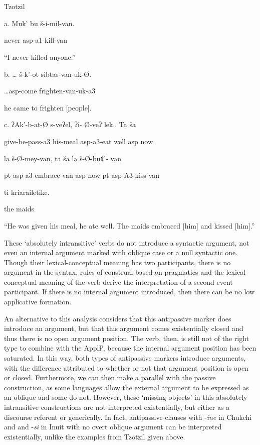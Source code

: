 \documentclass[output=paper,modfonts,nonflat]{langsci/langscibook}
\begin{document}
\ea%
    \label{ex:key:16}
    \gll\\
        \\
    \glt
    \z

          Tzotzil \citep{Aissen1983}

a.  Muk’  bu  š-i-mil-van.

  never    asp{}-a1-kill-van

“I never killed anyone.”

b.  … š-k’-ot  sibtas-van-uk-Ø.

  …asp{}-come  frighten-van{}-uk{}-a3

  he came to frighten [people].

c.  ʔAk’-b-at-Ø        s-veʔel,  ʔi-  Ø-veʔ    lek..  Ta  ša      

  give-be-pass-a3  his-meal  asp-a3-eat  well  asp     now 

  la  š-Ø-mey-van,  ta  ša  la  š-Ø-buȼ’- van

  pt  asp-a3-embrace-van  asp   now  pt   asp-A3-kiss-van

  ti  kriarailetike.

  the   maids

“He was given his meal, he ate well.  The maids embraced [him] and kissed [him].”

These ‘absolutely intransitive’ verbs do not introduce a syntactic argument, not even an internal argument marked with oblique case or a null syntactic one.  Though their lexical-conceptual meaning has two participants, there is no argument in the syntax; rules of construal based on pragmatics and the lexical-conceptual meaning of the verb derive the interpretation of a second event participant. If there is no internal argument introduced, then there can be no low applicative formation. 

An alternative to this analysis considers that this antipassive marker does introduce an argument, but that this argument comes existentially closed and thus there is no open argument position.  The verb, then, is still not of the right type to combine with the ApplP, because the internal argument position has been saturated.   In this way, both types of antipassive markers introduce arguments, with the difference attributed to whether or not that argument position is open or closed. Furthermore, we can then make a parallel with the passive construction, as some languages allow the external argument to be expressed as an oblique and some do not.  However, these ‘missing objects’ in this absolutely intransitive constructions are not interpreted existentially, but either as a discourse referent or generically. In fact, antipassive clauses with -\textit{ine} in Chukchi and and -\textit{si} in Inuit with no overt oblique argument can be interpreted existentially, unlike the examples from Tzotzil given above. 
\end{document}
